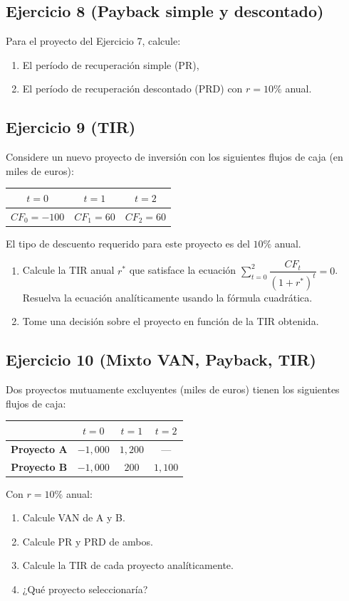 \documentclass[12pt,a4paper]{article}
\newenvironment{ejercicio}[1]{\subsection*{Ejercicio #1}}{}
\begin{document}
\begin{ejercicio}{8 (Payback simple y descontado)}
Para el proyecto del Ejercicio 7, calcule:
\begin{enumerate}[label=\alph*)]
  \item El período de recuperación simple (PR),
  \item El período de recuperación descontado (PRD) con $r=10\%$ anual.
\end{enumerate}
\end{ejercicio}

\begin{ejercicio}{9 (TIR)}
Considere un nuevo proyecto de inversión con los siguientes flujos de caja (en miles de euros):
\begin{table}[h]
\centering
\begin{tabular}{c c c}
\toprule
$t=0$ & $t=1$ & $t=2$ \\
\midrule
$CF_0=-100$ & $CF_1=60$ & $CF_2=60$ \\
\bottomrule
\end{tabular}
\end{table}
El tipo de descuento requerido para este proyecto es del $10\%$ anual.
\begin{enumerate}[label=\alph*)]
  \item Calcule la TIR anual $r^*$ que satisface la ecuación $\sum_{t=0}^{2}\dfrac{CF_t}{(1+r^*)^t}=0$. Resuelva la ecuación analíticamente usando la fórmula cuadrática.
  \item Tome una decisión sobre el proyecto en función de la TIR obtenida.
\end{enumerate}
\end{ejercicio}

\begin{ejercicio}{10 (Mixto VAN, Payback, TIR)}
Dos proyectos mutuamente excluyentes (miles de euros) tienen los siguientes flujos de caja:

\begin{table}[h]
\centering
\begin{tabular}{c c c c}
\toprule
& $t=0$ & $t=1$ & $t=2$ \\
\midrule
\textbf{Proyecto A} & $-1{,}000$ & $1{,}200$ & --- \\
\textbf{Proyecto B} & $-1{,}000$ & $200$ & $1{,}100$ \\
\bottomrule
\end{tabular}
\end{table}

Con $r=10\%$ anual:
\begin{enumerate}[label=\alph*)]
  \item Calcule VAN de A y B.
  \item Calcule PR y PRD de ambos.
  \item Calcule la TIR de cada proyecto analíticamente. 
  \item ¿Qué proyecto seleccionaría?
\end{enumerate}
\end{ejercicio}
\end{document}
